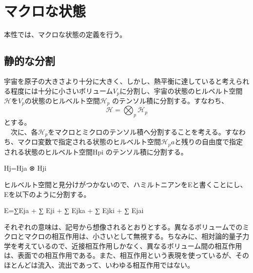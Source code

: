 \section{マクロな状態}
本性では、マクロな状態の定義を行う。
\subsection{静的な分割}
宇宙を原子の大きさより十分に大きく、しかし、熱平衡に達していると考えられる程度には十分に小さいボリューム$V_p$に分割し、宇宙の状態のヒルベルト空間$\mathcal{H}$を$V_p$の状態のヒルベルト空間$\mathcal{H}_p$ のテンソル積に分割する。すなわち、
\begin{equation}
    \mathcal{H} = \bigotimes_p \mathcal{H}_p
\end{equation}
とする。\\
　次に、各$\mathcal{H}_p$をマクロとミクロのテンソル積へ分割することを考える。すなわち、マクロ変数で指定される状態のヒルベルト空間$\mathcal{H}_pa$と残りの自由度で指定される状態のヒルベルト空間Hpi のテンソル積に分割する。

Hj=Hja ⊗ Hji

ヒルベルト空間と見分けがつかないので、ハミルトニアンをEと書くことにし、Eを以下のように分割する。

E=∑Eja + ∑ Eji + ∑ Ejka + ∑ Ejki + ∑ Ejai

それぞれの意味は、記号から想像されるとおりとする。異なるボリュームでのミクロとマクロの相互作用は、小さいとして無視する。ちなみに、相対論的量子力学を考えているので、近接相互作用しかなく、異なるボリューム間の相互作用は、表面での相互作用である。また、相互作用という表現を使っているが、そのほとんどは流入、流出であって、いわゆる相互作用ではない。